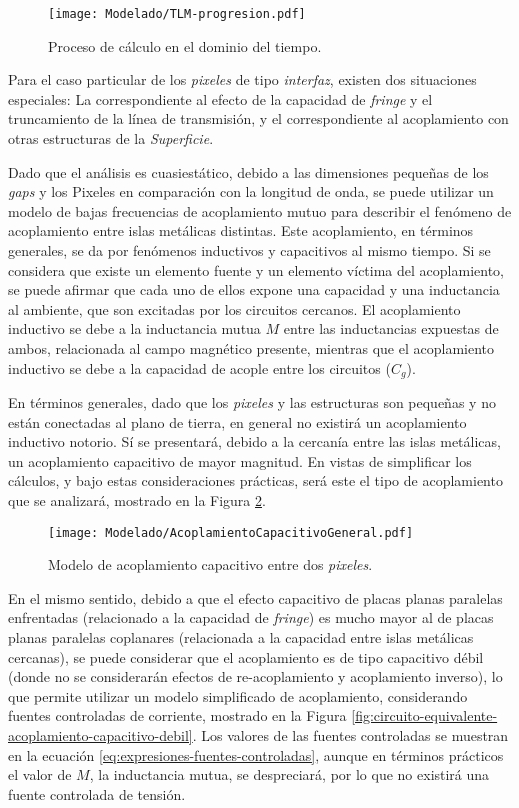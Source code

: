 \begin{figure}[h]
	\centering
	\texttt{[image: Modelado/TLM-progresion.pdf]}
	\caption{Proceso de cálculo en el dominio del tiempo.}
	\label{fig:procedimiento-tlm}
\end{figure}

Para el caso particular de los \textit{pixeles} de tipo \textit{interfaz}, existen dos situaciones especiales: La correspondiente al efecto de la capacidad de \textit{fringe} y el truncamiento de la línea de transmisión, y el correspondiente al acoplamiento con otras estructuras de la \textit{Superficie}.

Dado que el análisis es cuasiestático, debido a las dimensiones pequeñas de los \textit{gaps} y los Pixeles en comparación con la longitud de onda, se puede utilizar un modelo de bajas frecuencias de acoplamiento mutuo para describir el fenómeno de acoplamiento entre islas metálicas distintas. Este acoplamiento, en términos generales, se da por fenómenos inductivos y capacitivos al mismo tiempo. Si se considera que existe un elemento fuente y un elemento víctima del acoplamiento, se puede afirmar que cada uno de ellos expone una capacidad y una inductancia al ambiente, que son excitadas por los circuitos cercanos. El acoplamiento inductivo se debe a la inductancia mutua $M$ entre las inductancias expuestas de ambos, relacionada al campo magnético presente, mientras que el acoplamiento inductivo se debe a la capacidad de acople entre los circuitos ($C_{g}$).

En términos generales, dado que los \textit{pixeles} y las estructuras son pequeñas y no están conectadas al plano de tierra, en general no existirá un acoplamiento inductivo notorio. Sí se presentará, debido a la cercanía entre las islas metálicas, un acoplamiento capacitivo de mayor magnitud. En vistas de simplificar los cálculos, y bajo estas consideraciones prácticas, será este el tipo de acoplamiento que se analizará, mostrado en la Figura \ref{fig:acoplamiento-capacitivo-modelo}.

\begin{figure}[h]
	\centering
	\texttt{[image: Modelado/AcoplamientoCapacitivoGeneral.pdf]}
	\caption{Modelo de acoplamiento capacitivo entre dos \textit{pixeles}.}
	\label{fig:acoplamiento-capacitivo-modelo}
\end{figure}


En el mismo sentido, debido a que el efecto capacitivo de placas planas paralelas enfrentadas (relacionado a la capacidad de \textit{fringe}) es mucho mayor al de placas planas paralelas coplanares (relacionada a la capacidad entre islas metálicas cercanas), se puede considerar que el acoplamiento es de tipo capacitivo débil \cite{Tesche:EMC} (donde no se considerarán efectos de re-acoplamiento y acoplamiento inverso), lo que permite utilizar un modelo simplificado de acoplamiento, considerando fuentes controladas de corriente, mostrado en la Figura \ref{fig:circuito-equivalente-acoplamiento-capacitivo-debil}. Los valores de las fuentes controladas se muestran en la ecuación \ref{eq:expresiones-fuentes-controladas}, aunque en términos prácticos el valor de $M$, la inductancia mutua, se despreciará, por lo que no existirá una fuente controlada de tensión.

